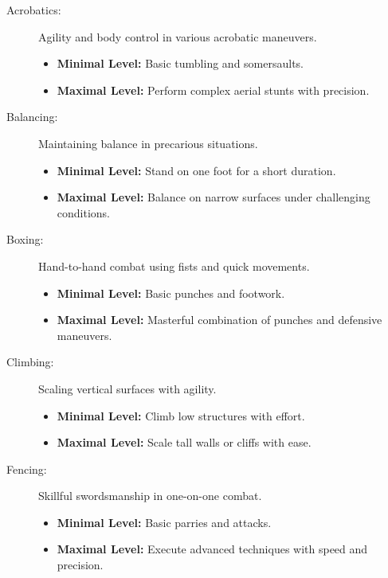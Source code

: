 \begin{description}
    \item[Acrobatics:] Agility and body control in various acrobatic maneuvers.
        \begin{itemize}
            \item \textbf{Minimal Level:} Basic tumbling and somersaults.
            \item \textbf{Maximal Level:} Perform complex aerial stunts with precision.
        \end{itemize}
    
    \item[Balancing:] Maintaining balance in precarious situations.
        \begin{itemize}
            \item \textbf{Minimal Level:} Stand on one foot for a short duration.
            \item \textbf{Maximal Level:} Balance on narrow surfaces under challenging conditions.
        \end{itemize}

    \item[Boxing:] Hand-to-hand combat using fists and quick movements.
        \begin{itemize}
            \item \textbf{Minimal Level:} Basic punches and footwork.
            \item \textbf{Maximal Level:} Masterful combination of punches and defensive maneuvers.
        \end{itemize}

    \item[Climbing:] Scaling vertical surfaces with agility.
        \begin{itemize}
            \item \textbf{Minimal Level:} Climb low structures with effort.
            \item \textbf{Maximal Level:} Scale tall walls or cliffs with ease.
        \end{itemize}

    \item[Fencing:] Skillful swordsmanship in one-on-one combat.
        \begin{itemize}
            \item \textbf{Minimal Level:} Basic parries and attacks.
            \item \textbf{Maximal Level:} Execute advanced techniques with speed and precision.
        \end{itemize}


\end{description}
